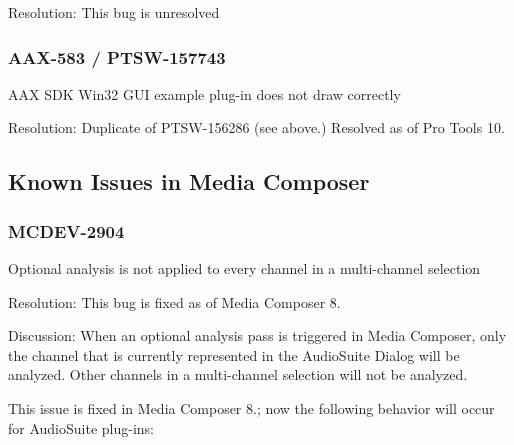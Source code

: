 Resolution\+: This bug is unresolved\hypertarget{a00374_AAX-583}{}\subsubsection{A\+A\+X-\/583 / P\+T\+S\+W-\/157743}\label{a00374_AAX-583}
A\+A\+X S\+D\+K Win32 G\+U\+I example plug-\/in does not draw correctly

Resolution\+: Duplicate of P\+T\+S\+W-\/156286 (see above.) Resolved as of Pro Tools 10.\hypertarget{a00374_knownissues_mc}{}\subsection{Known Issues in Media Composer}\label{a00374_knownissues_mc}
\hypertarget{a00374_MCDEV-2904}{}\subsubsection{M\+C\+D\+E\+V-\/2904}\label{a00374_MCDEV-2904}
Optional analysis is not applied to every channel in a multi-\/channel selection

Resolution\+: This bug is fixed as of Media Composer 8.

Discussion\+: When an optional analysis pass is triggered in Media Composer, only the channel that is currently represented in the Audio\+Suite Dialog will be analyzed. Other channels in a multi-\/channel selection will not be analyzed.

This issue is fixed in Media Composer 8.; now the following behavior will occur for Audio\+Suite plug-\/ins\+:

